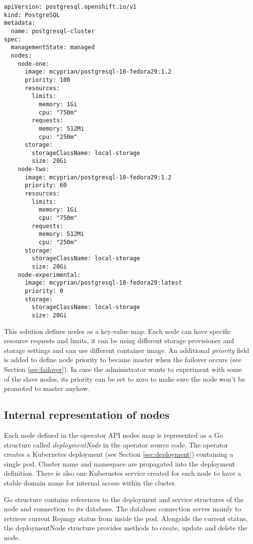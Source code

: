 \documentclass[
  digital, %
  twoside, %
  table,   %
  lof,     %
  lot,     %
]{fithesis3}
\begin{document}
\begin{lstlisting}
apiVersion: postgresql.openshift.io/v1
kind: PostgreSQL
metadata:
  name: postgresql-cluster
spec:
  managementState: managed
  nodes:
    node-one:
      image: mcyprian/postgresql-10-fedora29:1.2
      priority: 100
      resources:
        limits:
          memory: 1Gi
          cpu: "750m"
        requests:
          memory: 512Mi
          cpu: "250m"
      storage:
        storageClassName: local-storage
        size: 20Gi
    node-two:
      image: mcyprian/postgresql-10-fedora29:1.2
      priority: 60
      resources:
        limits:
          memory: 1Gi
          cpu: "750m"
        requests:
          memory: 512Mi
          cpu: "250m"
      storage:
        storageClassName: local-storage
        size: 20Gi
    node-experimental:
      image: mcyprian/postgresql-10-fedora29:latest
      priority: 0
      storage:
        storageClassName: local-storage
        size: 20Gi
\end{lstlisting}

This solution defines nodes as a key-value map. Each node can have specific resource requests and limits, it can be using different storage provisioner and storage settings and can use different container image. An additional \textit{priority} field is added to define node priority to became master when the failover occurs (see Section \ref{sec:failover}). In case the administrator wants to experiment with some of the slave nodes, its priority can be set to zero to make sure the node won't be promoted to master anyhow.

\subsection{Internal representation of nodes}
 Each node defined in the operator API nodes map is represented as a Go structure called \textit{deploymentNode} in the operator source code. The operator creates a Kubernetes deployment (see Section \ref{sec:deployment}) containing a single pod. Cluster name and namespace are propagated into the deployment definition. There is also one Kubernetes service created for each node to have a stable domain name for internal access within the cluster.

 Go structure contains references to the deployment and service structures of the node and connection to its database. The database connection serves mainly to retrieve current Repmgr status from inside the pod. Alongside the current status, the deploymentNode structure provides methods to create, update and delete the node.
\end{document}
